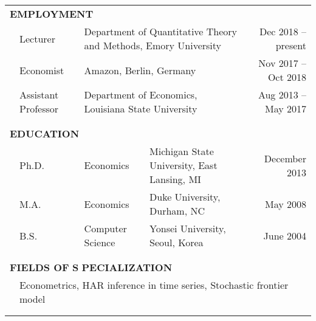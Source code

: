 \documentclass[10pt]{article}
\begin{document}
\begin{center}
\bigskip \bigskip 
\begin{tabular}{llllr}
\multicolumn{5}{l}{{\Large \textbf{E}}\textbf{MPLOYMENT}} \vspace{0.1cm}\\
&\multicolumn{1}{l}{Lecturer} & \multicolumn{2}{l}{Department of Quantitative Theory and Methods, Emory University}& \multicolumn{1}{r}{Dec 2018 -- present}\vspace{0.1cm} \\
&\multicolumn{1}{l}{Economist} & \multicolumn{2}{l}{Amazon, Berlin, Germany}& \multicolumn{1}{r}{Nov 2017 -- Oct 2018}\vspace{0.1cm} \\
&\multicolumn{1}{l}{Assistant Professor} &\multicolumn{2}{l}{Department of Economics, Louisiana State University}& \multicolumn{1}{r}{Aug 2013 -- May 2017} \\
\multicolumn{5}{p{500pt}}{}\\\\
\multicolumn{5}{l}{{\Large \textbf{E}}\textbf{DUCATION}} \vspace{0.1cm}\\
&\multicolumn{1}{l}{Ph.D.} & \multicolumn{1}{l}{Economics}&\multicolumn{1}{l}{Michigan State University, East Lansing, MI}& \multicolumn{1}{r}{December 2013} \\
&\multicolumn{1}{l}{M.A.} & \multicolumn{1}{l}{Economics}& \multicolumn{1}{l}{Duke University, Durham, NC} & \multicolumn{1}{r}{May 2008} \\
&\multicolumn{1}{l}{B.S.} & \multicolumn{1}{l}{Computer Science}& \multicolumn{1}{l}{Yonsei University, Seoul, Korea} & \multicolumn{1}{r}{June 2004} \\
\multicolumn{5}{p{500pt}}{}\\\\
\multicolumn{5}{l}{{\Large \textbf{F}}\textbf{IELDS OF} {\Large \textbf{S}}%
\textbf{PECIALIZATION}} \vspace{0.1cm}\\
& \multicolumn{4}{l}{Econometrics, HAR inference in time series, Stochastic frontier model} \\
\multicolumn{5}{p{500pt}}{}\\\\

\end{tabular}
\end{center}
\end{document}
